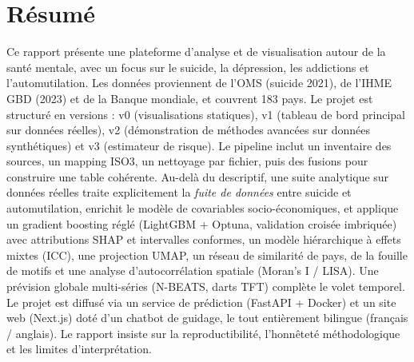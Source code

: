 \section*{Résumé}
Ce rapport présente une plateforme d'analyse et de visualisation autour de la santé mentale, avec un focus sur le suicide, la dépression, les addictions et l'automutilation. Les données proviennent de l'OMS (suicide 2021), de l'IHME GBD (2023) et de la Banque mondiale, et couvrent 183 pays. Le projet est structuré en versions : v0 (visualisations statiques), v1 (tableau de bord principal sur données réelles), v2 (démonstration de méthodes avancées sur données synthétiques) et v3 (estimateur de risque). Le pipeline inclut un inventaire des sources, un mapping ISO3, un nettoyage par fichier, puis des fusions pour construire une table cohérente. Au-delà du descriptif, une suite analytique sur données réelles traite explicitement la \emph{fuite de données} entre suicide et automutilation, enrichit le modèle de covariables socio-économiques, et applique un gradient boosting réglé (LightGBM + Optuna, validation croisée imbriquée) avec attributions SHAP et intervalles conformes, un modèle hiérarchique à effets mixtes (ICC), une projection UMAP, un réseau de similarité de pays, de la fouille de motifs et une analyse d'autocorrélation spatiale (Moran's I / LISA). Une prévision globale multi-séries (N-BEATS, darts TFT) complète le volet temporel. Le projet est diffusé via un service de prédiction (FastAPI + Docker) et un site web (Next.js) doté d'un chatbot de guidage, le tout entièrement bilingue (français / anglais). Le rapport insiste sur la reproductibilité, l'honnêteté méthodologique et les limites d'interprétation.

